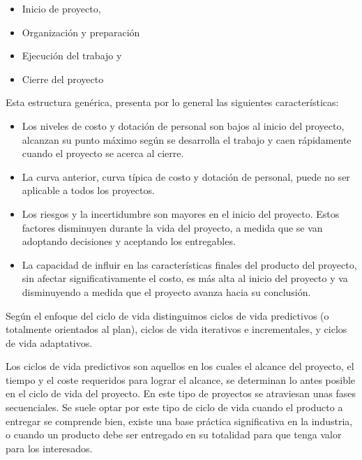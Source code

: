 \begin{itemize}
\item{Inicio de proyecto,}
\item{Organización y preparación}
\item{Ejecución del trabajo y}
\item{Cierre del proyecto}
\end{itemize}

Esta estructura genérica, presenta por lo general las siguientes características:

\begin{itemize}

\item{Los  niveles  de  costo  y  dotación  de  personal  son  bajos  al  inicio  del  proyecto,  alcanzan  su  punto  máximo según se desarrolla el trabajo y caen rápidamente cuando el proyecto se acerca al cierre.}

\item{La curva anterior, curva típica de costo y dotación de personal, puede no ser aplicable a todos los proyectos.}

\item{Los  riesgos  y  la  incertidumbre son  mayores  en  el  inicio  del  proyecto. Estos factores disminuyen durante la vida del proyecto, a medida que se van adoptando decisiones y aceptando los entregables.}

\item{La  capacidad  de  influir  en  las  características  finales  del  producto  del  proyecto,  sin  afectar  significativamente  el  costo,  es  más  alta  al  inicio  del  proyecto  y  va  disminuyendo  a  medida  que  el  proyecto  avanza  hacia  su  conclusión.}

\end{itemize}

Según el enfoque del ciclo de vida distinguimos ciclos de vida predictivos (o totalmente orientados al plan), ciclos de vida iterativos e incrementales, y ciclos de vida adaptativos.

Los ciclos de vida predictivos son aquellos en los cuales el alcance del proyecto, el tiempo y el coste requeridos para lograr el alcance, se determinan lo antes posible en el ciclo de vida del proyecto. En este tipo de proyectos se atraviesan unas fases secuenciales. Se suele optar por este tipo de ciclo de vida cuando el producto a entregar se comprende bien, existe una base práctica significativa en la industria, o cuando un producto debe ser entregado en su totalidad para que tenga valor para los interesados.

